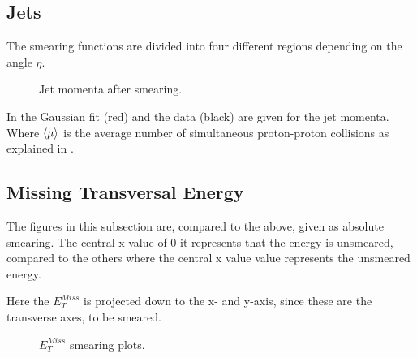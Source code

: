 \subsection{Jets}
The smearing functions are divided into four different regions depending on the angle $\eta$. 
 \begin{figure}[H] %
    \hfill
{}
    \hfill
    \hfill
{}
        \hfill
{}
            \hfill
{}
    \caption{Jet momenta after smearing.}
    \label{fig:jet}
\end{figure}
In  the Gaussian fit (red) and the data (black) are given for the jet momenta. Where $\left<\mu\right>$ is the average number of simultaneous proton-proton collisions as explained in .
\subsection{Missing Transversal Energy}
The figures in this subsection are, compared to the above, given as absolute smearing. The central x value of 0 it represents that the energy is unsmeared, compared to the others where the central x value value represents the unsmeared energy.

Here the $E_T^{Miss}$ is projected down to the x- and y-axis, since these are the transverse axes, to be smeared. 
 \begin{figure}[H] %
    \hfill
        \hfill
   \caption{$E_T^{Miss}$ smearing plots.}
    \label{fig:MET}
  \end{figure}
\newpage
